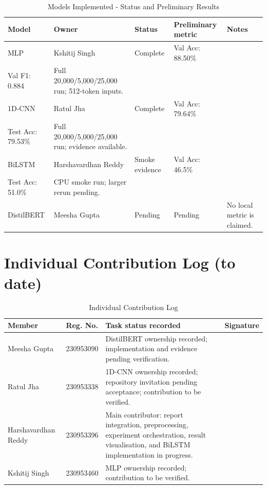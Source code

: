 \documentclass[10pt,a4paper]{article}
\begin{document}
\begin{table}[H]
\caption{Models Implemented - Status and Preliminary Results}
\centering\small\renewcommand{\arraystretch}{1.25}
\begin{tabularx}{\textwidth}{l l l >{\raggedright\arraybackslash}p{3cm} X}
\toprule
\textbf{Model} & \textbf{Owner} & \textbf{Status} & \textbf{Preliminary metric} & \textbf{Notes} \\
\midrule
MLP & Kshitij Singh & Complete & Val Acc: 88.50\%\\Val F1: 0.884 & Full 20,000/5,000/25,000 run; 512-token inputs. \\
\midrule
1D-CNN & Ratul Jha & Complete & Val Acc: 79.64\%\\Test Acc: 79.53\% & Full 20,000/5,000/25,000 run; evidence available. \\
\midrule
BiLSTM & Harshavardhan Reddy & Smoke evidence & Val Acc: 46.5\%\\Test Acc: 51.0\% & CPU smoke run; larger rerun pending. \\
\midrule
DistilBERT & Meesha Gupta & Pending & Pending & No local metric is claimed. \\
\bottomrule
\end{tabularx}
\end{table}

\section{Individual Contribution Log (to date)}
\begin{table}[H]
\caption{Individual Contribution Log}
\centering\small\renewcommand{\arraystretch}{1.3}
\begin{tabularx}{\textwidth}{l l >{\raggedright\arraybackslash}X l}
\toprule
\textbf{Member} & \textbf{Reg. No.} & \textbf{Task status recorded} & \textbf{Signature} \\
\midrule
Meesha Gupta & 230953090 & DistilBERT ownership recorded; implementation and evidence pending verification. & \\
\midrule
Ratul Jha & 230953338 & 1D-CNN ownership recorded; repository invitation pending acceptance; contribution to be verified. & \\
\midrule
Harshavardhan Reddy & 230953396 & Main contributor: report integration, preprocessing, experiment orchestration, result visualisation, and BiLSTM implementation in progress. & \\
\midrule
Kshitij Singh & 230953460 & MLP ownership recorded; contribution to be verified. & \\
\bottomrule
\end{tabularx}
\end{table}
\end{document}
